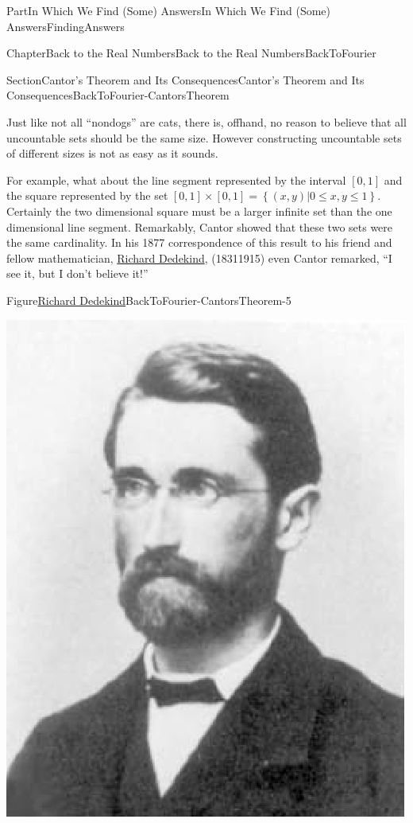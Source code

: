 \documentclass[oneside,10pt,]{book}
\numberwithin{equation}{part}
\begin{document}
\begin{partptx}{Part}{In Which We Find (Some) Answers}{}{In Which We Find (Some) Answers}{}{}{FindingAnswers}
\begin{chapterptx}{Chapter}{Back to the Real Numbers}{}{Back to the Real Numbers}{}{}{BackToFourier}
\begin{sectionptx}{Section}{Cantor's Theorem and Its Consequences}{}{Cantor's Theorem and Its Consequences}{}{}{BackToFourier-CantorsTheorem}
\par
Just like not all ``non\textendash{}dogs'' are cats, there is, offhand, no reason to believe that all uncountable sets should be the same size.  However constructing uncountable sets of different sizes is not as easy as it sounds.%
\par
{} For example, what about the line segment represented by the interval \([0,1]\) and the square represented by the set \([0,1]\times[0,1]=\left\{(x,y)|0\leq x,y\leq 1\right\}\). Certainly the two dimensional square must be a larger infinite set than the one dimensional line segment.  Remarkably, Cantor showed that these two sets were the same cardinality.  In his 1877 correspondence of this result to his friend and fellow mathematician, \href{https://mathshistory.st-andrews.ac.uk/Biographies/Dedekind/}{Richard Dedekind}, (1831\textendash{}1915) even Cantor remarked, ``I see it, but I don't believe it!''%
\begin{figureptx}{Figure}{\href{https://mathshistory.st-andrews.ac.uk/Biographies/Dedekind/}{Richard Dedekind}}{BackToFourier-CantorsTheorem-5}{}%
%
%
\begin{image}{0.325}{0.35}{0.325}{}%
\includegraphics[width=\linewidth]{external/images/Dedekind.png}

\end{image}
\end{figureptx}
\end{sectionptx}
\end{chapterptx}
\end{partptx}
\end{document}
